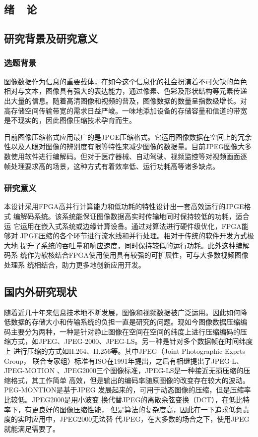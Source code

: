 \documentclass{article}
\numberwithin {equation}{section}
\begin{document}
\begin{spacing}{1.25} %
\section{绪\ \ 论}
  \subsection{研究背景及研究意义}
  \subsubsection{选题背景}
    \vspace{1em}
    图像数据作为信息的重要载体，在如今这个信息化的社会扮演着不可欠缺的角色
    相对与文本，图像具有强大的表达能力，通过像素、色彩及形状结构等元素传递
    出大量的信息。随着高清图像和视频的普及，图像数据的数量呈指数级增长。对
    高存储空间传输带宽的需求日益严峻。一味地添加设备的存储容量和信道的带宽
    是不现实的，因此图像压缩技术孕育而生。

    目前图像压缩格式应用最广的是JPGE压缩格式。它运用图像数据在空间上的冗余
    性以及人眼对图像的辨别度有限等特性来减少图像的数据量。目前JPEG图像大多
    数使用软件进行编解码。但对于医疗器械、自动驾驶、视频监控等对视频画面逐
    帧处理要求高的场景，这种方式有着效率低、运行功耗高等诸多缺点。
  \subsubsection{研究意义}
    \vspace{1em}
    本设计采用FPGA高并行计算能力和低功耗的特性设计出一套高效运行的JPGE格式
    编解码系统。该系统能保证图像数据高实时传输地同时保持较低的功耗，适合运
    它运用在嵌入式系统或边缘计算设备。通过对算法进行硬件级优化，FPGA能够对
    JPGE压缩的各个环节进行流水线和并行处理。相对于传统的软件开发方式极大地
    提升了系统的吞吐量和响应速度，同时保持较低的运行功耗。此外这种编解码系
    统作为软核结合FPGA使用使用具有较强的可扩展性，可与大多数视频图像处理系
    统相结合，助力更多地创新应用开发。
  \subsection{国内外研究现状}
    \vspace{1em}
    随着近几十年来信息技术地不断发展，图像和视频数据被广泛运用。因此如何降
    低数据的存储大小和传输系统的负担一直是研究的问题。现如今图像数据压缩编
    码主要分为两种，一种是针对静止图像在空间在空间的纬度上进行压缩编码的压
    缩方式，如JPEG、JPEG-2000、JPEG-LS。另一种是针对多个数据帧在时间纬度上
    进行压缩的方式如H.264、H.256等。其中JPEG（Joint Photographic Exprts Group，
    联合专家组）标准有ISO在1991年提出，之后有相继提出了JPEG-L、JPEG-MOTION
    、JPEG2000三个图像标准，JPEG-LS是一种接近无损压缩的压缩格式，其工作简单
    高效，但是输出的编码率随原图像的改变存在较大的波动。PEG-MONTION是基于JPEG
    发展起来的，可用于动态图像的压缩，但是压缩率比较低。JPEG2000是用小波变
    换代替JPEG的离散余弦变换（DCT），在低比特率下，有更良好的图像压缩性能，
    但是算法的复杂度高，因此在一下追求低负责度的实时应用中，JPEG2000无法替
    代JPEG，在大多数的场合之下，使用JPEG就能满足需要了。


\end{spacing}
\end{document}
